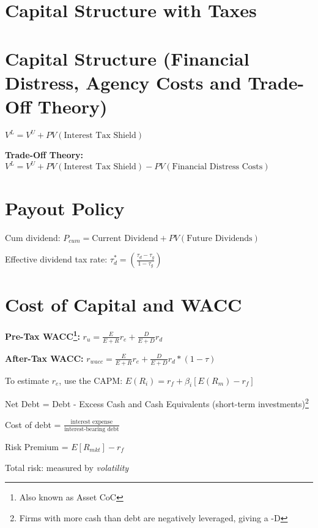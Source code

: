 \documentclass{report}
\begin{document}
\section{Capital Structure with Taxes}
\label{sec:capit-struct-2}

 \section{Capital Structure (Financial Distress, Agency Costs and Trade-Off Theory)}
\label{sec:capit-struct-3}

$V^L=V^U+PV(\mbox{Interest Tax Shield})$

\textbf{Trade-Off Theory:} $V^L = V^U + PV(\mbox{Interest Tax Shield}) - PV(\mbox{Financial Distress Costs})$
 
\section{Payout Policy}
\label{sec:payout-policy}

Cum dividend: $P_{cum}=\mbox{Current Dividend} + PV(\mbox{Future Dividends})$

Effective dividend tax rate: $\tau_d^*=(\frac{\tau_d-\tau_g}{1-\tau_g})$

\newpage
\section{Cost of Capital and WACC}
\label{sec:cost-capital-wacc}

\textbf{Pre-Tax WACC\footnote{Also known as Asset CoC}:} $r_u=\frac{E}{E+R}r_e+\frac{D}{E+D}r_d$

\textbf{After-Tax WACC:} $r_{wacc}=\frac{E}{E+R}r_e+\frac{D}{E+D}r_d*(1-\tau)$

\vspace*{1\baselineskip}
To estimate $r_e$, use the CAPM: $E(R_i)=r_f+\beta_i[E(R_m)-r_f]$

\vspace*{1\baselineskip}
Net Debt = Debt - Excess Cash and Cash Equivalents (short-term investments)\footnote{ Firms with more cash than debt are negatively leveraged, giving a -D}

Cost of debt = $\frac{\mbox{interest expense}}{\mbox{interest-bearing debt}}$

Risk Premium = $E[R_{mkt}]-r_f$

\vspace*{1\baselineskip}
Total risk: measured by \textit{volatility}
\end{document}
